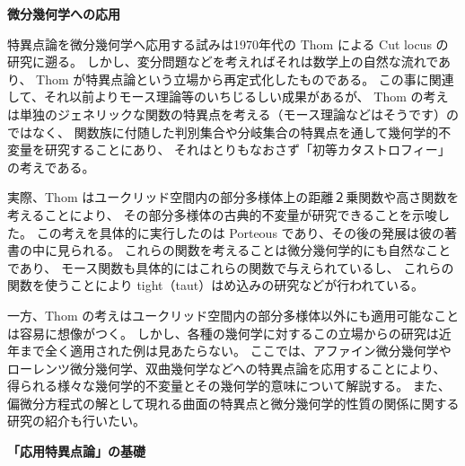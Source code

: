 \documentclass[uplatex,dvipdfmx]{jlreq}
\begin{document}
\newpage

\begin{center}
{\large\bfseries 微分幾何学への応用}

\hspace*{\fill}{\large\bfseries 泉屋 周一（北大・理）}
\end{center}

\medskip

特異点論を微分幾何学へ応用する試みは1970年代の Thom による Cut locus の研究に遡る。
しかし、変分問題などを考えればそれは数学上の自然な流れであり、
Thom が特異点論という立場から再定式化したものである。
この事に関連して、それ以前よりモース理論等のいちじるしい成果があるが、
Thom の考えは単独のジェネリックな関数の特異点を考える（モース理論などはそうです）のではなく、
関数族に付随した判別集合や分岐集合の特異点を通して幾何学的不変量を研究することにあり、
それはとりもなおさず「初等カタストロフィー」の考えである。

実際、Thom はユークリッド空間内の部分多様体上の距離２乗関数や高さ関数を考えることにより、
その部分多様体の古典的不変量が研究できることを示唆した。
この考えを具体的に実行したのは Porteous であり、その後の発展は彼の著書の中に見られる。
これらの関数を考えることは微分幾何学的にも自然なことであり、
モース関数も具体的にはこれらの関数で与えられているし、
これらの関数を使うことにより tight（taut）はめ込みの研究などが行われている。

一方、Thom の考えはユークリッド空間内の部分多様体以外にも適用可能なことは容易に想像がつく。
しかし、各種の幾何学に対するこの立場からの研究は近年まで全く適用された例は見あたらない。
ここでは、アファイン微分幾何学やローレンツ微分幾何学、双曲幾何学などへの特異点論を応用することにより、
得られる様々な幾何学的不変量とその幾何学的意味について解説する。
また、偏微分方程式の解として現れる曲面の特異点と微分幾何学的性質の関係に関する
研究の紹介も行いたい。

\newpage

\begin{center}
{\large\bfseries 「応用特異点論」の基礎}

\hspace*{\fill}{\large\bfseries 石川 剛郎（北大・理）}
\end{center}
\end{document}
